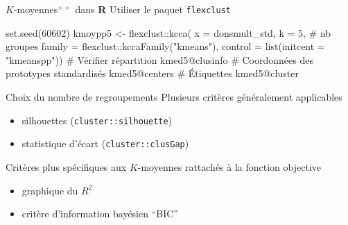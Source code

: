 \documentclass[
  ignorenonframetext,
]{beamer}
\newenvironment{Shaded}{\begin{snugshade}}{\end{snugshade}}
\newcommand{\AttributeTok}[1]{\textcolor[rgb]{0.40,0.45,0.13}{#1}}
\newcommand{\CommentTok}[1]{\textcolor[rgb]{0.37,0.37,0.37}{#1}}
\newcommand{\DecValTok}[1]{\textcolor[rgb]{0.68,0.00,0.00}{#1}}
\newcommand{\FunctionTok}[1]{\textcolor[rgb]{0.28,0.35,0.67}{#1}}
\newcommand{\NormalTok}[1]{\textcolor[rgb]{0.00,0.23,0.31}{#1}}
\newcommand{\OtherTok}[1]{\textcolor[rgb]{0.00,0.23,0.31}{#1}}
\newcommand{\SpecialCharTok}[1]{\textcolor[rgb]{0.37,0.37,0.37}{#1}}
\newcommand{\StringTok}[1]{\textcolor[rgb]{0.13,0.47,0.30}{#1}}
\providecommand{\tightlist}{%
  \setlength{\itemsep}{0pt}\setlength{\parskip}{0pt}}\usepackage{longtable,booktabs,array}
\begin{document}
\begin{frame}[fragile]{\(K\)-moyennes\({}^{++}\) dans \textbf{R}}
\protect\hypertarget{k-moyennes-dans-r-1}{}
Utiliser le paquet \texttt{flexclust}

\begin{Shaded}
\begin{Highlighting}[numbers=left,,]
\FunctionTok{set.seed}\NormalTok{(}\DecValTok{60602}\NormalTok{)}
\NormalTok{kmoypp5 }\OtherTok{\textless{}{-}}\NormalTok{ flexclust}\SpecialCharTok{::}\FunctionTok{kcca}\NormalTok{(}
  \AttributeTok{x =}\NormalTok{ donsmult\_std,}
  \AttributeTok{k =} \DecValTok{5}\NormalTok{, }\CommentTok{\# nb groupes}
  \AttributeTok{family =}\NormalTok{ flexclust}\SpecialCharTok{::}\FunctionTok{kccaFamily}\NormalTok{(}\StringTok{"kmeans"}\NormalTok{),}
  \AttributeTok{control =} \FunctionTok{list}\NormalTok{(}\AttributeTok{initcent =} \StringTok{"kmeanspp"}\NormalTok{))}
\CommentTok{\# Vérifier répartition}
\NormalTok{kmed5}\SpecialCharTok{@}\NormalTok{clusinfo}
\CommentTok{\# Coordonnées des prototypes standardisés}
\NormalTok{kmed5}\SpecialCharTok{@}\NormalTok{centers}
\CommentTok{\# Étiquettes}
\NormalTok{kmed5}\SpecialCharTok{@}\NormalTok{cluster}
\end{Highlighting}
\end{Shaded}
\end{frame}

\begin{frame}[fragile]{Choix du nombre de regroupements}
\protect\hypertarget{choix-du-nombre-de-regroupements}{}
Plusieurs critères généralement applicables

\begin{itemize}
\tightlist
\item
  silhouettes (\texttt{cluster::silhouette})
\item
  statistique d'écart (\texttt{cluster::clusGap})
\end{itemize}

Critères plus spécifiques aux \(K\)-moyennes rattachés à la fonction
objective

\begin{itemize}
\tightlist
\item
  graphique du \(R^2\)
\item
  critère d'information bayésien ``BIC''
\end{itemize}
\end{frame}
\end{document}
